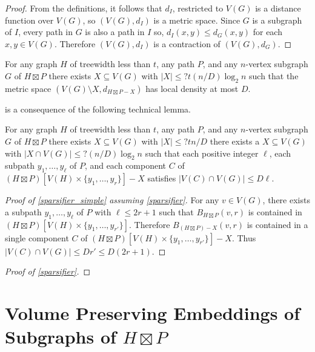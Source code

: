 \documentclass{patmorin}
\begin{document}
\begin{proof}
  From the definitions, it follows that $d_I$, restricted to $V(G)$ is a distance function over $V(G)$, so $(V(G),d_I)$ is a metric space.  Since $G$ is a subgraph of $I$, every path in $G$ is also a path in $I$ so, $d_I(x,y)\le d_G(x,y)$ for each $x,y\in V(G)$.  Therefore $(V(G),d_I)$ is a contraction of $(V(G),d_G)$.
\end{proof}

\begin{lem}\label{sparsifier_simple}
  For any graph $H$ of treewidth less than $t$, any path $P$, and any $n$-vertex subgraph $G$ of $H\boxtimes P$ there exists $X\subseteq V(G)$ with $|X|\le ?t(n/D)\log_2 n$ such that the metric space $(V(G)\setminus X, d_{H\boxtimes P-X})$ has local density at most $D$.
\end{lem}

 is a consequence of the following technical lemma.

\begin{lem}\label{sparsifier}
  For any graph $H$ of treewidth less than $t$, any path $P$, and any $n$-vertex subgraph $G$ of $H\boxtimes P$ there exists $X\subseteq V(G)$ with $|X|\le ?tn/D$  there exists a $X\subseteq V(G)$ with $|X\cap V(G)|\le ?(n/D)\log_2 n$ such that each positive integer $\ell$, each subpath $y_1,\ldots,y_\ell$ of $P$, and each component $C$ of $(H\boxtimes P)[V(H)\times \{y_1,\ldots,y_r\}]-X$ satisfies $|V(C)\cap V(G)|\le D\ell$.
\end{lem}

\begin{proof}[Proof of \cref{sparsifier_simple} assuming \cref{sparsifier}]
  For any $v\in V(G)$, there exists a subpath $y_1,\ldots,y_{\ell}$ of $P$ with $\ell\le 2r+1$ such that $B_{H\boxtimes P}(v,r)$ is contained in $(H\boxtimes P)[V(H)\times \{y_1,\ldots,y_{r'}\}]$.  Therefore $B_{(H\boxtimes P)-X}(v,r)$ is contained in a single component $C$ of $(H\boxtimes P)[V(H)\times \{y_1,\ldots,y_{r'}\}]-X$.  Thus $|V(C)\cap V(G)|\le Dr'\le D(2r+1)$.
\end{proof}

\begin{proof}[Proof of \cref{sparsifier}]
\end{proof}


\section{\boldmath Volume Preserving Embeddings of Subgraphs of $H\boxtimes P$}
\end{document}
